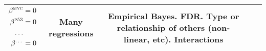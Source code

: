 \begin{frame}
\begin{textblock*}{153mm}
\begin{tabular}{>{\centering}m{2.92cm} c c p{1.0cm} m{1.92cm}}
$\begin{aligned}
  \beta^{\textsc{myc}} &= 0\\
  \beta^{\textsc{p53}} &= 0\\
\ldots\\
  \beta^{\textsc{\ldots}} &= 0
\end{aligned}$
&
Many regressions
&
Empirical Bayes.
FDR. {\tiny Type or relationship of others (non-linear, etc). Interactions}
\\

\hline
\end{tabular}
\end{textblock*}
\end{frame}
